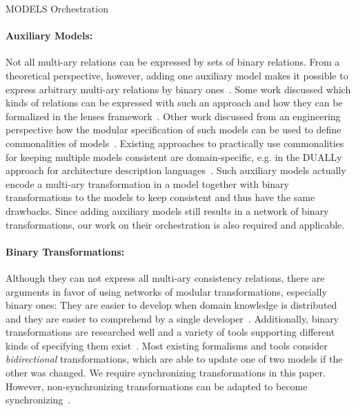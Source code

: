 \begin{copiedFrom}{MODELS Orchestration}
\paragraph{Auxiliary Models:}
Not all multi-ary relations can be expressed by sets of binary relations.
From a theoretical perspective, however, adding one auxiliary model makes it possible to express arbitrary multi-ary relations by binary ones~\cite{stevens2020BidirectionalTransformationLarge-SoSym}.
Some work discussed which kinds of relations can be expressed with such an approach and how they can be formalized in the lenses framework~\cite{stunkel2018MultimodelCorrespondence-ICPS, diskin2018MultiModelSynchronization-FASE}.
Other work discussed from an engineering perspective how the modular specification %
of such models can be used to define commonalities of models~\cite{klare2019models}.
Existing approaches to practically use commonalities for keeping multiple models consistent are domain-specific, e.g. in the DUALLy approach for architecture description languages~\cite{malavolta2010ADLInteroperability-TSE, eramo2012Dually-SoSym}.
Such auxiliary models actually encode a multi-ary transformation in a model together with binary transformations to the models to keep consistent and thus have the same drawbacks.
Since adding auxiliary models still results in a network of binary transformations, our work on their orchestration is also required and applicable.

\paragraph{Binary Transformations:}
Although they can not express all multi-ary consistency relations, there are arguments in favor of using networks of modular transformations, especially binary ones:
They are easier to develop when domain knowledge is distributed~\cite{klare2018docsym} and they are easier to comprehend by a single developer~\cite{cleve2019dagstuhl, stevens2020BidirectionalTransformationLarge-SoSym}.
Additionally, binary transformations are researched well and a variety of tools supporting different kinds of specifying them exist~\cite{stevens2008LandscapeBidirectionalTransformation-GTTSE, etzlstorfer2013SurveyIncrementalTransformation-ME, samimi-dehkordi2016iccke, macedo2017ModelRepairClassification-TSE}.
Most existing formalisms and tools consider \emph{bidirectional} transformations, which are able to update one of two models if the other was changed.
We require synchronizing transformations in this paper.
However, non-synchronizing transformations can be adapted to become synchronizing~\cite{xiong2013SynchronizingConcurrentUpdates-SoSym}.


\end{copiedFrom}
